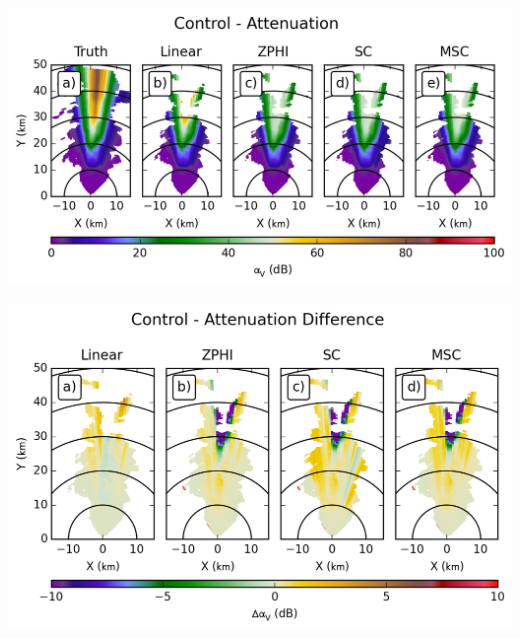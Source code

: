 \documentclass[red]{beamer}
\begin{document}
\begin{frame}
    \begin{center}
        \includegraphics[scale=0.7]{figures/spatial/X_Control_Attenuation_V}
    \end{center}
\end{frame}

\begin{frame}
    \begin{center}
        \includegraphics[scale=0.7]{figures/spatial/X_Control_Attenuation_Difference_V}
    \end{center}
\end{frame}
\end{document}
